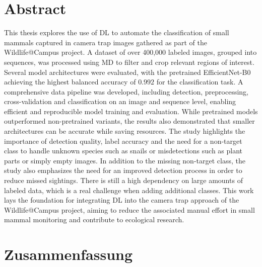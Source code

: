 

\vspace*{\fill}
\section*{Abstract}
\label{abstract}

This thesis explores the use of \ac{DL} to automate the classification of small mammals captured in camera trap images gathered as part of the Wildlife@Campus project.
A dataset of over 400,000 labeled images, grouped into sequences, was processed using \ac{MD} to filter and crop relevant regions of interest.
Several model architectures were evaluated, with the pretrained EfficientNet-B0 achieving the highest balanced accuracy of \(0.992\) for the classification task.
A comprehensive data pipeline was developed, including detection, preprocessing, cross-validation and classification on an image and sequence level, enabling efficient and reproducible model training and evaluation.
While pretrained models outperformed non-pretrained variants, the results also demonstrated that smaller architectures can be accurate while saving resources.
The study highlights the importance of detection quality, label accuracy and the need for a non-target class to handle unknown species such as snails or misdetections such as plant parts or simply empty images.
In addition to the missing non-target class, the study also emphasizes the need for an improved detection process in order to reduce missed sightings.
There is still a high dependency on large amounts of labeled data, which is a real challenge when adding additional classes.
This work lays the foundation for integrating \ac{DL} into the camera trap approach of the Wildlife@Campus project, aiming to reduce the associated manual effort in small mammal monitoring and contribute to ecological research.
\vspace*{\fill}

\newpage

\vspace*{\fill}
\section*{Zusammenfassung}

